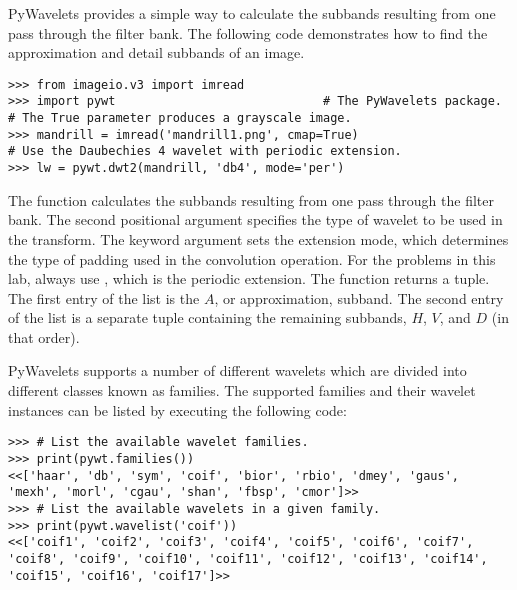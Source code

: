 PyWavelets provides a simple way to calculate the subbands resulting from one pass through the filter bank.
The following code demonstrates how to find the approximation and detail subbands of an image.

\begin{lstlisting}
>>> from imageio.v3 import imread
>>> import pywt                             # The PyWavelets package.
# The True parameter produces a grayscale image.
>>> mandrill = imread('mandrill1.png', cmap=True)
# Use the Daubechies 4 wavelet with periodic extension.
>>> lw = pywt.dwt2(mandrill, 'db4', mode='per')
\end{lstlisting}

The function  calculates the subbands resulting from one pass through the filter bank.
The second positional argument specifies the type of wavelet to be used in the transform.
The  keyword argument sets the extension mode, which determines the type of padding used in the convolution operation.
For the problems in this lab, always use , which is the periodic extension.
The function  returns a tuple.
The first entry of the list is the $A$, or approximation, subband.
The second entry of the list is a separate tuple containing the remaining subbands, $H$, $V$, and $D$ (in that order).
\begin{comment}
These subbands can be plotted as follows:

\begin{lstlisting}
>>> plt.subplot(221)
>>> plt.imshow(lw[0], cmap='gray')
>>> plt.axis('off')
>>> plt.subplot(222)
# The absolute value of the detail subbands is plotted to highlight contrast.
>>> plt.imshow(np.abs(lw[1][0]), cmap='gray')
>>> plt.axis('off')
>>> plt.subplot(223)
>>> plt.imshow(np.abs(lw[1][1]), cmap='gray')
>>> plt.axis('off')
>>> plt.subplot(224)
>>> plt.imshow(np.abs(lw[1][2]), cmap='gray')
>>> plt.axis('off')
>>> plt.subplots_adjust(wspace=0, hspace=0)      # Remove space between plots.
\end{lstlisting}
\end{comment}

PyWavelets supports a number of different wavelets which are divided into different classes known as families.
The supported families and their wavelet instances can be listed by executing the following code:

\begin{lstlisting}
>>> # List the available wavelet families.
>>> print(pywt.families())
<<['haar', 'db', 'sym', 'coif', 'bior', 'rbio', 'dmey', 'gaus', 'mexh', 'morl', 'cgau', 'shan', 'fbsp', 'cmor']>>
>>> # List the available wavelets in a given family.
>>> print(pywt.wavelist('coif'))
<<['coif1', 'coif2', 'coif3', 'coif4', 'coif5', 'coif6', 'coif7', 'coif8', 'coif9', 'coif10', 'coif11', 'coif12', 'coif13', 'coif14', 'coif15', 'coif16', 'coif17']>>
\end{lstlisting}

